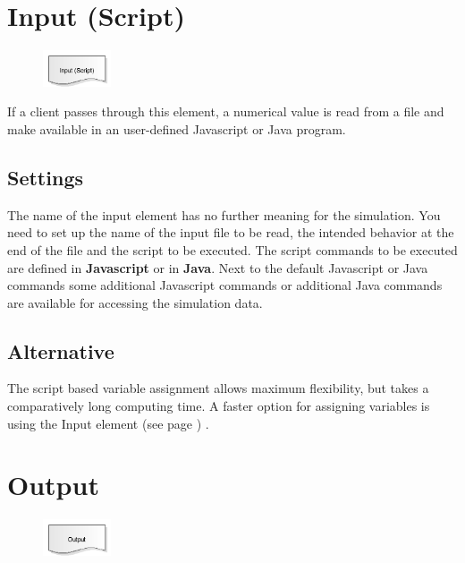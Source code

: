 \section{Input (Script)}
\label{ref:ModelElementInputJS}

\begin{figure}
\vspace{-22pt}
\includegraphics[width=2cm]{imageModelElementInputJS.png}
\vspace{-22pt}
\end{figure}

If a client passes through this element, a numerical value is read from a file
and make available in an user-defined Javascript or Java program.

\subsection*{Settings}

The name of the input element has no further meaning for the simulation.
You need to set up the name of the input file to be read, the intended behavior
at the end of the file and the script to be executed.
The script commands to be executed are defined in \textbf{Javascript} or in \textbf{Java}.
Next to the default Javascript or Java commands some 
additional Javascript commands or
additional Java commands 
are available for accessing the simulation data.

\subsection*{Alternative}

The script based variable assignment allows maximum flexibility, but takes a comparatively long
computing time. A faster option for assigning variables is using the
Input element (see page \pageref{ref:ModelElementInput}) .


\section{Output}
\label{ref:ModelElementOutput}

\begin{figure}
\vspace{-22pt}
\includegraphics[width=2cm]{imageModelElementOutput.png}
\vspace{-22pt}
\end{figure}


